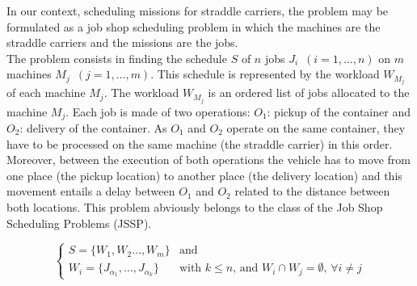 \documentclass[a4paper,12pt]{article}
\begin{document}

In our context, scheduling missions for straddle carriers, the problem may be formulated as a job shop scheduling problem in which the machines are the straddle carriers and the missions are the jobs. \\

The problem consists in finding the schedule $S$ of $n$ jobs $J_i$~$(i=1,\ldots,n)$ on $m$ machines $M_j$~$(j=1,\ldots,m)$. This schedule is represented by the workload $W_{M_j}$ of each machine $M_j$. The workload $W_{M_j}$ is an ordered list of jobs allocated to the machine $M_j$. Each job is made of two operations: $O_1$: pickup of the container and $O_2$: delivery of the container. As $O_1$ and $O_2$ operate on the same container, they have to be processed on the same machine (the straddle carrier) in this order. Moreover, between the execution of both operations the vehicle has to move from one place (the pickup location) to another place (the delivery location) and this movement entails a delay between $O_1$ and $O_2$ related to the distance between both locations. This problem abviously belongs to the class of the Job Shop Scheduling Problems (JSSP).

\begin{equation*}
\begin{cases}
 S = \{ W_{1} , W_{2} \ldots , W_{m}\} & \text{and}\\
 W_{i} = \{ J_{\alpha_1} , \ldots , J_{\alpha_k} \} & \text{with $k \leq n$, and $W_{i} \cap W_{j} = \emptyset$,  $\forall i \neq j$} 
\end{cases}
\end{equation*}
 
\end{document}
